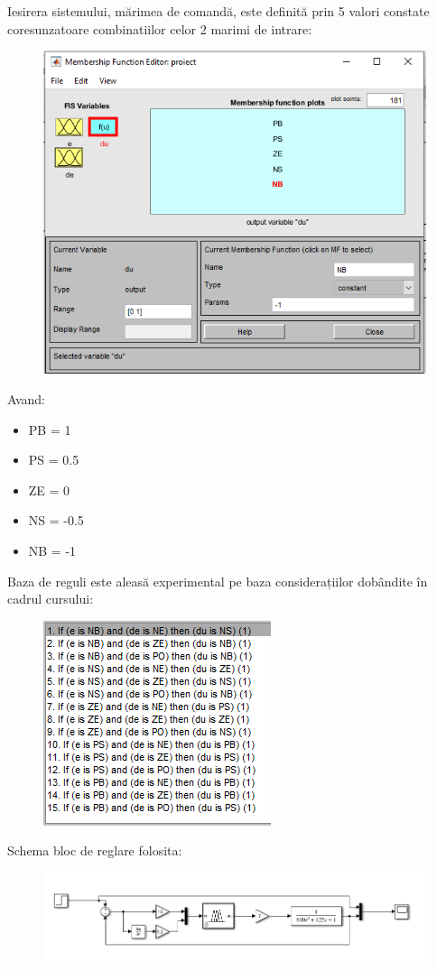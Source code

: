\documentclass[11pt]{article}
\begin{document}
Iesirera sistemului, mărimea de comandă, este definită prin 5 valori constate coresunzatoare combinatiilor celor 2 marimi de intrare:
\begin{figure}[H]
	\centering
	\includegraphics[width=0.5\linewidth]{iesire.PNG}
	\label{fig:test2}
\end{figure}
Avand:
\begin{itemize}
	\item PB = 1
	\item PS = 0.5
	\item ZE = 0
	\item NS = -0.5
	\item NB = -1
\end{itemize}
Baza de reguli este aleasă experimental pe baza considerațiilor dobândite în cadrul cursului:
\begin{figure}[H]
	\centering
	\includegraphics[width=0.4\linewidth]{rules.PNG}
	\label{fig:test2}
\end{figure}
Schema bloc de reglare folosita:
\begin{figure}[H]
	\centering
	\includegraphics[width=1\linewidth]{schema_sim.PNG}
	\label{fig:test2}
\end{figure}
\end{document}
